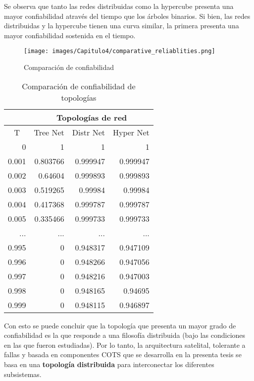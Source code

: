 Se observa que tanto las redes distribuidas como la hypercube presenta una mayor confiabilidad através del tiempo que  los árboles binarios. Si bien, las redes distribuidas y la hypercube tienen una curva similar, la primera presenta una mayor confiabilidad sostenida en el tiempo.

\begin{figure}[H]
 \centering
 \texttt{[image: images/Capitulo4/comparative\_reliablities.png]}
  \caption{Comparación de confiabilidad}
\label{fig:comparative_reliablities}
\end{figure}

\begin{table}[H]
\centering
\caption{Comparación de confiabilidad de topologías}
\label{table_comprative_reliability}
\begin{tabular}{r|r|r|r|}
\cline{2-4}
\multicolumn{1}{l|}{} & \multicolumn{3}{c|}{Topologías de red} \\ \hline
\multicolumn{1}{|c|}{T} & \multicolumn{1}{c|}{Tree Net} & \multicolumn{1}{c|}{Distr Net} & \multicolumn{1}{c|}{Hyper Net} \\ \hline
\multicolumn{1}{|r|}{0} & 1 & 1 & 1 \\ \hline
\multicolumn{1}{|r|}{0.001} & 0.803766 & 0.999947 & 0.999947 \\ \hline
\multicolumn{1}{|r|}{0.002} & 0.64604 & 0.999893 & 0.999893 \\ \hline
\multicolumn{1}{|r|}{0.003} & 0.519265 & 0.99984 & 0.99984 \\ \hline
\multicolumn{1}{|r|}{0.004} & 0.417368 & 0.999787 & 0.999787 \\ \hline
\multicolumn{1}{|r|}{0.005} & 0.335466 & 0.999733 & 0.999733 \\ \hline
\multicolumn{1}{|r|}{...} & ... & ... & ... \\ \hline
\multicolumn{1}{|r|}{0.995} & 0 & 0.948317 & 0.947109 \\ \hline
\multicolumn{1}{|r|}{0.996} & 0 & 0.948266 & 0.947056 \\ \hline
\multicolumn{1}{|r|}{0.997} & 0 & 0.948216 & 0.947003 \\ \hline
\multicolumn{1}{|r|}{0.998} & 0 & 0.948165 & 0.94695 \\ \hline
\multicolumn{1}{|r|}{0.999} & 0 & 0.948115 & 0.946897 \\ \hline
\end{tabular}
\end{table}


Con esto se puede concluir que la topología que presenta un mayor grado de confiabilidad es la que responde a una filosofía distribuida (bajo las condiciones en las que fueron estudiadas). Por lo tanto, la arquitectura satelital, tolerante a fallas y basada en componentes COTS que se desarrolla en la presenta tesis se basa en una \textbf{topología distribuida} para interconectar los diferentes subsistemas.

